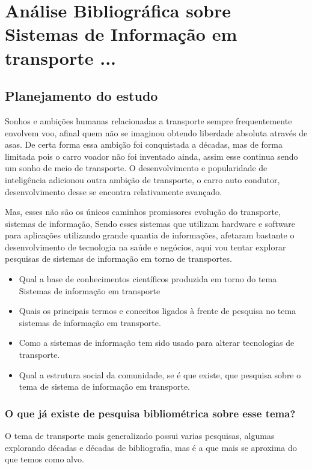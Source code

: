 \chapter{Análise Bibliográfica sobre Sistemas de Informação em transporte ...\label{chap:bibliometria:MoustacheGolem}}


\section{Planejamento do estudo}

Sonhos e ambições humanas relacionadas a transporte sempre frequentemente envolvem voo, afinal quem não se imaginou obtendo liberdade absoluta através de asas. De certa forma essa ambição foi conquistada a décadas, mas de forma limitada pois o carro voador não foi inventado ainda, assim esse continua sendo um sonho de meio de transporte. O desenvolvimento e popularidade de inteligência adicionou outra ambição de transporte, o carro auto condutor, desenvolvimento desse se encontra relativamente avançado. 

Mas, esses não são os únicos caminhos promissores evolução do transporte, sistemas de informação, Sendo esses sistemas que utilizam hardware e software para aplicações utilizando grande quantia de informações, afetaram bastante o desenvolvimento de tecnologia na saúde e negócios, aqui vou tentar explorar pesquisas de sistemas de informação em torno de transportes.


\begin{itemize}
    

\item Qual a base de conhecimentos científicos produzida em torno do tema
Sistemas de informação em transporte


\item Quais os principais termos e conceitos ligados à frente de pesquisa no tema sistemas de informação em transporte.

\item Como a sistemas de informação tem sido usado para alterar tecnologias de transporte.

\item Qual a estrutura social da comunidade, se é que existe, que pesquisa
sobre o tema de sistema de informação em transporte.
\end{itemize}

\subsection{O que já existe de pesquisa bibliométrica sobre
esse tema?}
O tema de transporte mais generalizado possui varias pesquisas, algumas explorando décadas e décadas de bibliografia, mas \cite{cobo_bibliometric_2013} é a que mais se aproxima do que temos como alvo.



